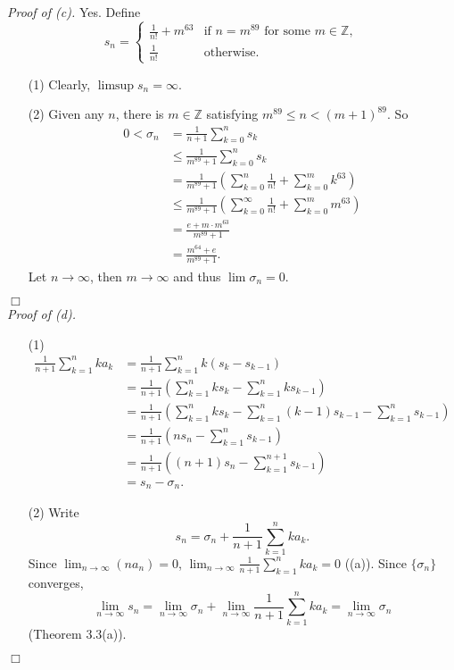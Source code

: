 \documentclass{article}
\begin{document}
\emph{Proof of (c).}
Yes.
Define
\begin{equation*}
  s_n =
    \begin{cases}
      \frac{1}{n!} + m^{63}
        & \text{if $n = m^{89}$ for some $m \in \mathbb{Z}$}, \\
      \frac{1}{n!}
        & \text{otherwise}.
    \end{cases}
\end{equation*}
\begin{enumerate}
\item[(1)]
Clearly, $\limsup s_n = \infty$.
\item[(2)]
Given any $n$, there is $m \in \mathbb{Z}$ satisfying $m^{89} \leq n < (m+1)^{89}$.
So
\begin{align*}
  0 < \sigma_n
  &= \frac{1}{n+1}\sum_{k=0}^{n} s_k \\
  &\leq \frac{1}{m^{89}+1}\sum_{k=0}^{n} s_k \\
  &= \frac{1}{m^{89}+1}
    \left( \sum_{k=0}^{n} \frac{1}{n!} + \sum_{k=0}^{m} k^{63} \right) \\
  &\leq \frac{1}{m^{89}+1}
    \left( \sum_{k=0}^{\infty} \frac{1}{n!} + \sum_{k=0}^{m} m^{63} \right) \\
  &= \frac{e + m \cdot m^{63}}{m^{89}+1} \\
  &= \frac{m^{64} + e}{m^{89}+1}.
\end{align*}
Let $n \to \infty$, then $m \to \infty$ and thus $\lim \sigma_n = 0$.
\end{enumerate}
$\Box$ \\



\emph{Proof of (d).}
\begin{enumerate}
\item[(1)]
  \begin{align*}
  \frac{1}{n+1}\sum_{k=1}^{n}ka_k
  &= \frac{1}{n+1}\sum_{k=1}^{n}k(s_k - s_{k-1}) \\
  &= \frac{1}{n+1}\left( \sum_{k=1}^{n}ks_k - \sum_{k=1}^{n}ks_{k-1} \right) \\
  &= \frac{1}{n+1}\left( \sum_{k=1}^{n}ks_k
    - \sum_{k=1}^{n}(k-1)s_{k-1} - \sum_{k=1}^{n}s_{k-1} \right) \\
  &= \frac{1}{n+1}\left( ns_n - \sum_{k=1}^{n}s_{k-1} \right) \\
  &= \frac{1}{n+1}\left( (n+1)s_n - \sum_{k=1}^{n+1}s_{k-1} \right) \\
  &= s_n - \sigma_n.
  \end{align*}
\item[(2)]
Write
$$s_n = \sigma_n + \frac{1}{n+1}\sum_{k=1}^{n}ka_k.$$
Since $\lim_{n \to \infty} (na_n) = 0$,
$\lim_{n \to \infty} \frac{1}{n+1}\sum_{k=1}^{n}ka_k = 0$ ((a)).
Since $\{\sigma_n\}$ converges,
$$\lim_{n \to \infty} s_n
= \lim_{n \to \infty} \sigma_n + \lim_{n \to \infty} \frac{1}{n+1}\sum_{k=1}^{n}ka_k
= \lim_{n \to \infty} \sigma_n$$
(Theorem 3.3(a)).
\end{enumerate}
$\Box$ \\
\end{document}
